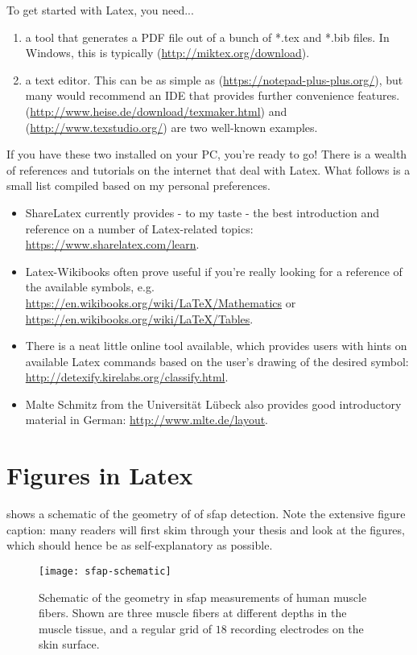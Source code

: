 To get started with Latex, you need...
\begin{enumerate}
\item a tool that generates a PDF file out of a bunch of *.tex and *.bib files.
In Windows, this is typically  (\url{http://miktex.org/download}).
\item a text editor. This can be as simple as  (\url{https://notepad-plus-plus.org/}), but many would recommend an IDE that provides further convenience features.  (\url{http://www.heise.de/download/texmaker.html}) and  (\url{http://www.texstudio.org/}) are two well-known examples.
\end{enumerate}
If you have these two installed on your PC, you're ready to go!
There is a wealth of references and tutorials on the internet that deal with Latex.
What follows is a small list compiled based on my personal preferences.
\begin{itemize}
\item ShareLatex currently provides - to my taste - the best introduction and reference on a number of Latex-related topics: \url{https://www.sharelatex.com/learn}.
\item Latex-Wikibooks often prove useful if you're really looking for a reference of the available symbols, e.g. \url{https://en.wikibooks.org/wiki/LaTeX/Mathematics} or \url{https://en.wikibooks.org/wiki/LaTeX/Tables}.
\item There is a neat little online tool available, which provides users with hints on available Latex commands based on the user's drawing of the desired symbol: \url{http://detexify.kirelabs.org/classify.html}.
\item Malte Schmitz from the Universität Lübeck also provides good introductory material in German: \url{http://www.mlte.de/layout}.
\end{itemize}


\section{Figures in Latex}
 shows a schematic of the geometry of of \gls{sfap} detection.
Note the extensive figure caption: many readers will first skim through your thesis and look at the figures, which should hence be as self-explanatory as possible.
\begin{figure}
  \centering
  \texttt{[image: sfap-schematic]}
  \caption[Geometry of Single Fiber Action Potential (SFAP) measurements]{Schematic of the geometry in \acrfull{sfap} measurements of human muscle fibers. Shown are three muscle fibers at different depths in the muscle tissue, and a regular grid of $18$ recording electrodes on the skin surface.}
  \label{fig:sfap-schematic}
\end{figure}


